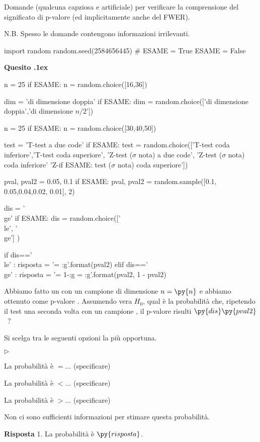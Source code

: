 \documentclass[11pt,twoside,a4paper]{article}
\newcommand{\mylabel}[1]{#1\hfill}
\renewenvironment{itemize}
  {\begin{list}{$\triangleright$}{%
   \setlength{\parskip}{0mm}
   \setlength{\topsep}{.4\baselineskip}
   \setlength{\rightmargin}{0mm}
   \setlength{\listparindent}{0mm}
   \setlength{\itemindent}{0mm}
   \setlength{\labelwidth}{2ex}
   \setlength{\itemsep}{.4\baselineskip}
   \setlength{\parsep}{0mm}
   \setlength{\partopsep}{0mm}
   \setlength{\labelsep}{1ex}
   \setlength{\leftmargin}{\labelwidth+\labelsep}
   \let\makelabel\mylabel}}{%
   \end{list}\vspace*{-1.3mm}}
\newcounter{quesito}
\newenvironment{question}{\bigskip\addtocounter{quesito}{1}\par\textbf{Quesito \thequesito.\kern1ex}}{\vspace{\parskip}}
\newenvironment{answer}{\par\textbf{Risposta\quad}}{\vspace{\parskip}}
\begin{document}
\colorbox{blue!10}{\begin{minipage}{\textwidth}
Domande (qualcuna capziosa e artificiale) per verificare la comprensione del significato di p-valore (ed implicitamente anche del FWER).\bigskip

N.B. Spesso le domande contengono informazioni irrilevanti.
\end{minipage}}

\bigskip\bigskip

\begin{pycode}
import random
random.seed(2584656445)
# ESAME = True
ESAME = False
\end{pycode}

\begin{question} %
\begin{pycode}
n = 25
if ESAME: n = random.choice([16,36])

dim = 'di dimensione doppia'
if ESAME: dim  = random.choice(['di dimensione doppia','di dimensione $n/2$'])

n = 25
if ESAME: n = random.choice([30,40,50])

test = 'T-test a due code'
if ESAME: test = random.choice(['T-test coda inferiore','T-test coda superiore', 'Z-test ($\sigma$ nota) a due code', 'Z-test ($\sigma$ nota) coda inferiore' 'Z-if ESAME: test ($\sigma$ nota) coda superiore'])

pval, pval2 = 0.05, 0.1
if ESAME: pval, pval2 = random.sample([0.1, 0.05,0.04,0.02, 0.01], 2)

dis = '\\ge'
if ESAME: dis = random.choice(['\\le', '\\ge'] )

if   dis=='\\le' : risposta = '= {:g}'.format(pval2)
elif dis=='\\ge' : risposta = '= 1-{:g} = {:g}'.format(pval2, 1 - pval2)
\end{pycode}
Abbiamo fatto un  con un campione di dimensione $n=\py{n}$ e abbiamo ottenuto come p-valore .
Assumendo vera $H_0$, qual è la probabilità che, ripetendo il test una seconda volta con un campione , il p-valore risulti $\py{dis}\py{pval2}$~?

Si scelga tra le seguenti opzioni la più opportuna.
\begin{itemize}
\item[1.] La probabilità è $=\dots$ (specificare)
\item[2.] La probabilità è $<\dots$ (specificare)
\item[3.] La probabilità è $>\dots$ (specificare)
\item[4.] Non ci sono sufficienti informazioni per stimare questa probabilità.
\end{itemize}
\begin{answer}
{\color{blue}1. La probabilità è $\py{risposta}$.}
\end{answer}
\end{question}
\end{document}
